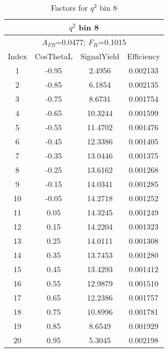 \begin{table*}[htbH]
  \begin{center}
  \caption{Factors for $q^2$ bin 8 
  \label{tab:factors_bin8}}
  \small
  \begin{tabular}{|c||c|c|c|}
    \hline
    \multicolumn{4}{|c|}{$q^2$ bin 8} \\ 
    \hline
    \multicolumn{4}{|c|}{$A_{FB}$=0.0477;   $F_{H}$=0.1015} \\ 
    \hline
    Index & CosThetaL & SignalYield & Efficiency \\ 
    \hline
    1 & -0.95 & 2.4956 & 0.002133 \\ 
    2 & -0.85 & 6.1854 & 0.002135 \\ 
    3 & -0.75 & 8.6731 & 0.001754 \\ 
    4 & -0.65 & 10.3244 & 0.001599 \\ 
    5 & -0.55 & 11.4702 & 0.001476 \\ 
    6 & -0.45 & 12.3386 & 0.001405 \\ 
    7 & -0.35 & 13.0446 & 0.001375 \\ 
    8 & -0.25 & 13.6162 & 0.001268 \\ 
    9 & -0.15 & 14.0341 & 0.001285 \\ 
    10 & -0.05 & 14.2718 & 0.001252 \\ 
    11 & 0.05 & 14.3245 & 0.001249 \\ 
    12 & 0.15 & 14.2204 & 0.001323 \\ 
    13 & 0.25 & 14.0111 & 0.001308 \\ 
    14 & 0.35 & 13.7453 & 0.001280 \\ 
    15 & 0.45 & 13.4293 & 0.001412 \\ 
    16 & 0.55 & 12.9879 & 0.001510 \\ 
    17 & 0.65 & 12.2386 & 0.001757 \\ 
    18 & 0.75 & 10.8996 & 0.001781 \\ 
    19 & 0.85 & 8.6549 & 0.001929 \\ 
    20 & 0.95 & 5.3045 & 0.002198 \\ 
    \hline
  \end{tabular}
  \end{center}
\end{table*}


